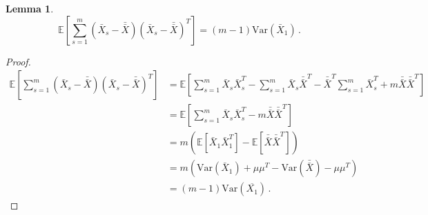 \documentclass[12pt]{article}
\newcommand{\Var}{\text{Var}}
\newtheorem{lemma}{Lemma}
\theoremstyle{remark}
\begin{document}
\begin{lemma} \label{lemma:bias2}
\[\mathbb{E}\left[\sum\limits_{s=1}^{m} \left(\bar{X}_{s} - \bar{\bar{X}} \right) \left(\bar{X}_{s} - \bar{\bar{X}} \right)^{T}\right] =  (m-1)\text{Var}(\bar{X}_1)\,.
\]
\end{lemma}


\begin{proof}
\begin{align*}
\mathbb{E}\left[\sum_{s=1}^{m} \left(\bar{X}_{s} - \bar{\bar{X}} \right)  \left(\bar{X}_{s} - \bar{\bar{X}} \right)^{T}\right] &= \mathbb{E}\left[\sum_{s=1}^{m}\bar{X}_{s}\bar{X}_{s}^{T} -\sum_{s=1}^{m}\bar{X}_{s}\bar{\bar{X}}^{T} - \bar{\bar{X}}^{T}\sum_{s=1}^{m}\bar{X}_{s}^{T} + m\bar{\bar{X}}\bar{\bar{X}}^{T}\right]\\
&= \mathbb{E}\left[\sum_{s=1}^{m}\bar{X}_{s}\bar{X}_{s}^{T} - m\bar{\bar{X}}\bar{\bar{X}}^{T}\right]\\
&= m\left(\mathbb{E}\left[\bar{X}_{1}\bar{X}_{1}^{T}\right] - \mathbb{E}\left[\bar{\bar{X}}\bar{\bar{X}}^{T}\right]\right)\\
&= m\left(\Var(\bar{X}_{1}) + \mu\mu^{T} - \Var(\bar{\bar{X}}) - \mu\mu^{T}\right)\\
&= (m-1)\Var(\overline{X_1})\,.
\end{align*}
\end{proof}
\end{document}
